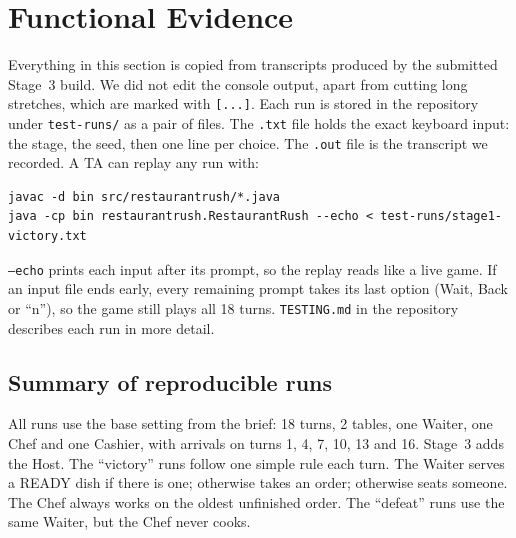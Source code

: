 \section{Functional Evidence}
\label{sec:functional}


Everything in this section is copied from transcripts produced by the submitted
Stage~3 build. We did not edit the console output, apart from cutting long stretches,
which are marked with \texttt{[...]}. Each run is stored in the repository under
\texttt{test-runs/} as a pair of files. The \texttt{.txt} file holds the exact keyboard
input: the stage, the seed, then one line per choice. The \texttt{.out} file is the
transcript we recorded. A TA can replay any run with:

\begin{lstlisting}[style=run]
javac -d bin src/restaurantrush/*.java
java -cp bin restaurantrush.RestaurantRush --echo < test-runs/stage1-victory.txt
\end{lstlisting}

\texttt{--echo} prints each input after its prompt, so the replay reads like a live
game. If an input file ends early, every remaining prompt takes its last option (Wait,
Back or ``n''), so the game still plays all 18 turns. \texttt{TESTING.md} in the
repository describes each run in more detail.

\subsection{Summary of reproducible runs}

All runs use the base setting from the brief: 18 turns, 2 tables, one Waiter, one Chef
and one Cashier, with arrivals on turns 1, 4, 7, 10, 13 and 16. Stage~3 adds the Host.
The ``victory'' runs follow one simple rule each turn. The Waiter serves a READY dish if
there is one; otherwise takes an order; otherwise seats someone. The Chef always works on
the oldest unfinished order. The ``defeat'' runs use the same Waiter, but the Chef never
cooks.

